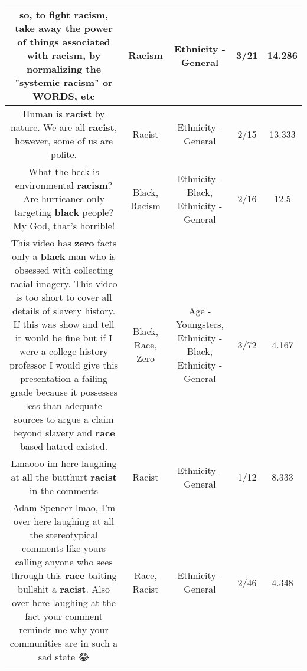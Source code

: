 \documentclass[11pt]{article}
\newlength\mylength
\begin{document}
\begin{center}
\begin{longtable}{|C{.65\mylength}|C{.30\mylength}|C{.12\mylength}|C{.12\mylength}|C{.12\mylength}|}
  \small so, to fight \textbf{racism}, take away the power of things associated with \textbf{racism}, by normalizing the "systemic \textbf{racism}" or WORDS, etc\normalsize   & Racism & Ethnicity - General & 3/21 & 14.286 \\  \hline
  \small Human is \textbf{racist} by nature. We are all \textbf{racist}, however, some of us are polite.\normalsize   & Racist & Ethnicity - General & 2/15 & 13.333 \\  \hline
  \small What the heck is environmental \textbf{racism}? Are hurricanes only targeting \textbf{black} people? My God, that's horrible!\normalsize   & Black, Racism & Ethnicity - Black, Ethnicity - General & 2/16 & 12.5 \\  \hline
  \small This video has \textbf{zero} facts only a \textbf{black} man who is obsessed with collecting racial imagery. This video is too short to cover all details of slavery history. If this was show and tell it would be fine but if I were a college history professor I would give this presentation a failing grade because it possesses less than adequate sources to argue a claim beyond slavery and \textbf{race} based hatred existed.\normalsize   & Black, Race, Zero & Age - Youngsters, Ethnicity - Black, Ethnicity - General & 3/72 & 4.167 \\  \hline
  \small Lmaooo im here laughing at all the butthurt \textbf{racist} in the comments\normalsize   & Racist & Ethnicity - General & 1/12 & 8.333 \\  \hline
  \small Adam Spencer lmao, I'm over here laughing at all the stereotypical comments like yours calling anyone who sees through this \textbf{race} baiting bullshit a \textbf{racist}.  Also over here laughing at the fact your comment reminds me why your communities are in such a sad state 😂\normalsize   & Race, Racist & Ethnicity - General & 2/46 & 4.348 \\  \hline

\end{longtable}
\end{center}
\end{document}
